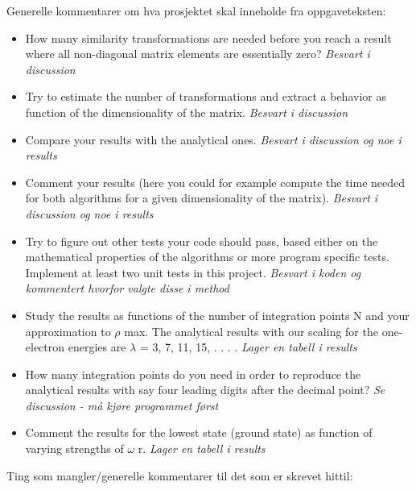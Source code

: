 \documentclass{article}
\begin{document}
Generelle kommentarer om hva prosjektet skal inneholde fra oppgaveteksten:

\begin{itemize}

  \item How many similarity transformations are needed before you reach a result
  where all non-diagonal matrix elements are essentially zero?  \textit{Besvart i discussion}

  \item Try to estimate the number of transformations and extract a behavior as function of the dimensionality of the matrix. \textit{Besvart i discussion}

  \item Compare your results with the analytical ones. \textit{Besvart i discussion og noe i results}

  \item Comment your results (here you could for example compute the time needed for both algorithms for a given dimensionality of the matrix). \textit{Besvart i discussion og noe i results}

  \item Try to figure out other tests your code should pass, based either on the mathematical properties of the algorithms or more program specific tests. Implement at least two unit tests in this project. \textit{Besvart i koden og kommentert hvorfor valgte disse i method}

  \item Study the results as functions of the number of integration points N and your approximation to $\rho$ max. The analytical results with our scaling for the one-electron energies are $\lambda$ = 3, 7, 11, 15, . . . . \textit{Lager en tabell i results}

  \item How many integration points do you need in order to reproduce the analytical results with say four leading digits after the decimal point?  \textit{Se discussion - må kjøre programmet først}

  \item Comment the results for the lowest state (ground state) as function of varying strengths of $ \omega$ r. \textit{Lager en tabell i results}

\end{itemize}

\vspace{2cm}

Ting som mangler/generelle kommentarer til det som er skrevet hittil:
\end{document}
